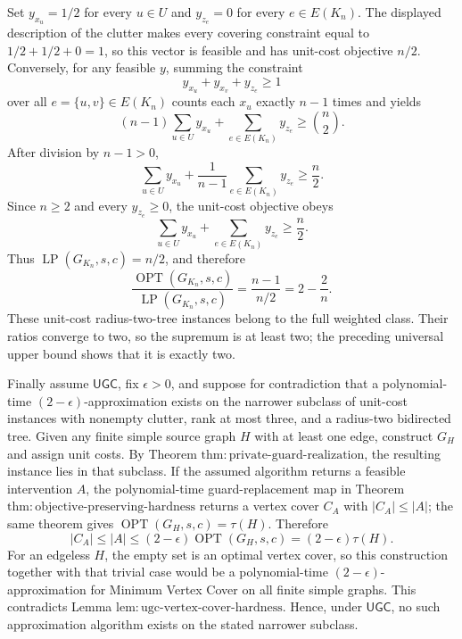 Set \(y_{x_u}=1/2\) for every \(u\in U\) and \(y_{z_e}=0\) for every \(e\in E(K_n)\).  The displayed description of the clutter makes every covering constraint equal to \(1/2+1/2+0=1\), so this vector is feasible and has unit-cost objective \(n/2\).  Conversely, for any feasible \(y\), summing the constraint
\[
 y_{x_u}+y_{x_v}+y_{z_e}\geq1
\]
over all \(e=\{u,v\}\in E(K_n)\) counts each \(x_u\) exactly \(n-1\) times and yields
\[
 (n-1)\sum_{u\in U}y_{x_u}+\sum_{e\in E(K_n)}y_{z_e}
 \geq \binom n2.
\]
After division by \(n-1>0\),
\[
 \sum_{u\in U}y_{x_u}
 +\frac{1}{n-1}\sum_{e\in E(K_n)}y_{z_e}
 \geq \frac n2.
\]
Since \(n\geq2\) and every \(y_{z_e}\geq0\), the unit-cost objective obeys
\[
 \sum_{u\in U}y_{x_u}+\sum_{e\in E(K_n)}y_{z_e}
 \geq \frac n2.
\]
Thus \(\operatorname{LP}(G_{K_n},s,c)=n/2\), and therefore
\[
 \frac{\operatorname{OPT}(G_{K_n},s,c)}
 {\operatorname{LP}(G_{K_n},s,c)}
 =\frac{n-1}{n/2}=2-\frac2n.
\]
These unit-cost radius-two-tree instances belong to the full weighted class.  Their ratios converge to two, so the supremum is at least two; the preceding universal upper bound shows that it is exactly two.

Finally assume \(\mathsf{UGC}\), fix \(\epsilon>0\), and suppose for contradiction that a polynomial-time \((2-\epsilon)\)-approximation exists on the narrower subclass of unit-cost instances with nonempty clutter, rank at most three, and a radius-two bidirected tree.  Given any finite simple source graph \(H\) with at least one edge, construct \(G_H\) and assign unit costs.  By Theorem \(\mathrm{thm{:}private\mbox{-}guard\mbox{-}realization}\), the resulting instance lies in that subclass.  If the assumed algorithm returns a feasible intervention \(A\), the polynomial-time guard-replacement map in Theorem \(\mathrm{thm{:}objective\mbox{-}preserving\mbox{-}hardness}\) returns a vertex cover \(C_A\) with \(|C_A|\leq |A|\); the same theorem gives \(\operatorname{OPT}(G_H,s,c)=\tau(H)\).  Therefore
\[
 |C_A|
 \leq |A|
 \leq (2-\epsilon)\operatorname{OPT}(G_H,s,c)
 =(2-\epsilon)\tau(H).
\]
For an edgeless \(H\), the empty set is an optimal vertex cover, so this construction together with that trivial case would be a polynomial-time \((2-\epsilon)\)-approximation for Minimum Vertex Cover on all finite simple graphs.  This contradicts Lemma \(\mathrm{lem{:}ugc\mbox{-}vertex\mbox{-}cover\mbox{-}hardness}\).  Hence, under \(\mathsf{UGC}\), no such approximation algorithm exists on the stated narrower subclass.
